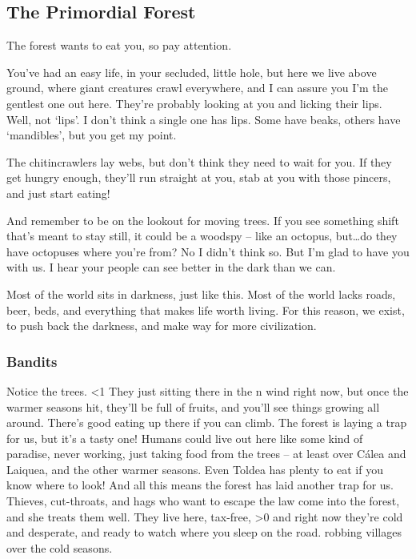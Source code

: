 \begin{multicols}{2}

\subsection*{The Primordial Forest}

\begin{exampletext}

  The forest wants to eat you, so pay attention.

  You've had an easy life, in your secluded, little hole, but here we live above ground, where giant creatures crawl everywhere, and I can assure you I'm the gentlest one out here.
  They're probably looking at you and licking their lips.
Well, not `lips'.
  I don't think a single one has lips.
  Some have beaks, others have `mandibles', but you get my point.

  The chitincrawlers lay webs, but don't think they need to wait for you.
  If they get hungry enough, they'll run straight at you, stab at you with those pincers, and just start eating!

  And remember to be on the lookout for moving trees.
  If you see something shift that's meant to stay still, it could be a woodspy -- like an octopus, but\ldots do they have octopuses where you're from?
  No I didn't think so.
  But I'm glad to have you with us.
  I hear your people can see better in the dark than we can.

  Most of the world sits in darkness, just like this.
  Most of the world lacks roads, beer, beds, and everything that makes life worth living.
  For this reason, we exist, to push back the darkness, and make way for more civilization.

  \subsubsection*{Bandits}

  Notice the trees.
  \ifnum\value{temperature}<1
    They just sitting there in the \showSeason n wind right now, but once the warmer seasons hit, they'll be full of fruits, and you'll see things growing all around.
  \else
    There's good eating up there if you can climb.
    The forest is laying a trap for us, but it's a tasty one!
  \fi
  Humans could live out here like some kind of paradise, never working, just taking food from the trees -- at least over C\'alea and Laiquea, and the other warmer seasons.
  Even Toldea has plenty to eat if you know where to look!
  And all this means the forest has laid another trap for us.
  Thieves, cut-throats, and hags who want to escape the law come into the forest, and she treats them well.
  They live here, tax-free,
  \ifnum\value{temperature}>0
    and right now they're cold and desperate, and ready to watch where you sleep on the road.
  \else
    robbing \glspl{village} over the cold seasons.
  \fi


\end{exampletext}
\end{multicols}
